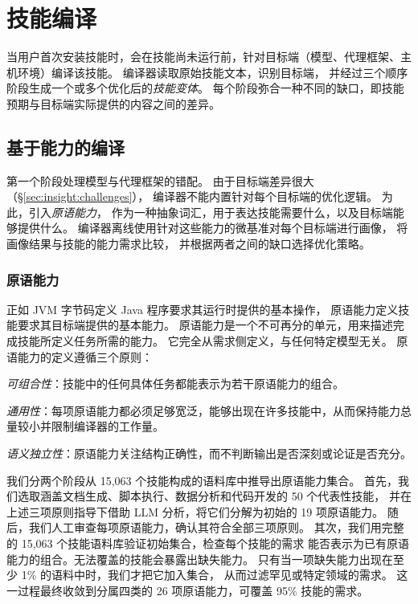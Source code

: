 \section{技能编译}
\label{sec:compiler}

当用户首次安装技能时，\sys 会在技能尚未运行前，针对目标端（模型、代理框架、主机环境）编译该技能。
编译器读取原始技能文本，识别目标端，
并经过三个顺序阶段生成一个或多个优化后的\emph{技能变体}。
每个阶段弥合一种不同的缺口，即技能预期与目标端实际提供的内容之间的差异。

\subsection{基于能力的编译}
\label{sec:compiler:cap}

第一个阶段处理模型与代理框架的错配。
由于目标端差异很大（\S\ref{sec:insight:challenges}），
编译器不能内置针对每个目标端的优化逻辑。
为此，\sys 引入\emph{原语能力}，
作为一种抽象词汇，用于表达技能需要什么，以及目标端能够提供什么。
编译器离线使用针对这些能力的微基准对每个目标端进行画像，
将画像结果与技能的能力需求比较，
并根据两者之间的缺口选择优化策略。

\subsubsection{原语能力}

正如 JVM 字节码定义 Java 程序要求其运行时提供的基本操作，
原语能力定义技能要求其目标端提供的基本能力。
原语能力是一个不可再分的单元，用来描述完成技能所定义任务所需的能力。
它完全从需求侧定义，与任何特定模型无关。
原语能力的定义遵循三个原则：
\begin{myitemize}
  \item \emph{可组合性}：技能中的任何具体任务都能表示为若干原语能力的组合。
  \item \emph{通用性}：每项原语能力都必须足够宽泛，能够出现在许多技能中，从而保持能力总量较小并限制编译器的工作量。
  \item \emph{语义独立性}：原语能力关注结构正确性，而不判断输出是否深刻或论证是否充分。
\end{myitemize}

我们分两个阶段从 15,063 个技能构成的语料库中推导出原语能力集合。
首先，我们选取涵盖文档生成、脚本执行、数据分析和代码开发的 50 个代表性技能，
并在上述三项原则指导下借助 LLM 分析，将它们分解为初始的 19 项原语能力。
随后，我们人工审查每项原语能力，确认其符合全部三项原则。
其次，我们用完整的 15,063 个技能语料库验证初始集合，检查每个技能的需求
能否表示为已有原语能力的组合。无法覆盖的技能会暴露出缺失能力。
只有当一项缺失能力出现在至少 1\% 的语料中时，我们才把它加入集合，
从而过滤罕见或特定领域的需求。
这一过程最终收敛到分属四类的 26 项原语能力，可覆盖 95\% 技能的需求。

